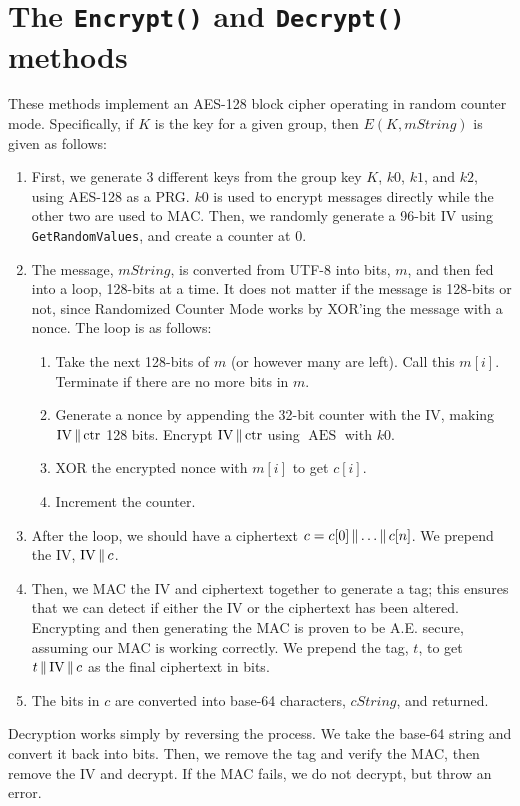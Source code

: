 \documentclass{amsart}
\DeclareMathOperator{\AES}{AES}
\begin{document}
\section{The \texttt{Encrypt()} and \texttt{Decrypt()} methods}%
These methods implement an AES-128 block cipher operating in random counter mode. Specifically, if $K$ is the key for a given group, then $E(K,mString)$ is given as follows:
\begin{enumerate}
\item First, we generate 3 different keys from the group key $K$, $k0$, $k1$, and $k2$, using AES-128 as a PRG. $k0$ is used to encrypt messages directly while the other two are used to MAC. Then, we randomly generate a 96-bit IV using \verb+GetRandomValues+, and create a counter at 0.
\item The message, $mString$, is converted from UTF-8 into bits, $m$, and then fed into a loop, 128-bits at a time. It does not matter if the message is 128-bits or not, since Randomized Counter Mode works by XOR'ing the message with a nonce. The loop is as follows:
  \begin{enumerate}
    \item Take the next 128-bits of $m$ (or however many are left). Call this $m[i]$. Terminate if there are no more bits in $m$.
    \item Generate a nonce by appending the 32-bit counter with the IV, making $\mathrm{IV}\operatorname{\|}\operatorname{ctr}$ 128 bits. Encrypt $\mathrm{IV}\operatorname{\|} \mathrm{ctr}$ using $\AES$ with $k0$.
    \item XOR the encrypted nonce with $m[i]$ to get $c[i]$.
    \item Increment the counter.
  \end{enumerate}
\item After the loop, we should have a ciphertext $c = c[0] \operatorname{\|} \dots \operatorname{\|} c[n]$. We prepend the IV, $\mathrm{IV} \operatorname{\|} c$.
\item Then, we MAC the IV and ciphertext together to generate a tag; this ensures that we can detect if either the IV or the ciphertext has been altered. Encrypting and then generating the MAC is proven to be A.E. secure, assuming our MAC is working correctly. We prepend the tag, $t$, to get $t \operatorname{\|} \mathrm{IV} \operatorname{\|} c$ as the final ciphertext in bits.
\item The bits in $c$ are converted into base-64 characters, $cString$, and returned.
\end{enumerate}

Decryption works simply by reversing the process. We take the base-64 string and convert it back into bits. Then, we remove the tag and verify the MAC, then remove the IV and decrypt. If the MAC fails, we do not decrypt, but throw an error.
\end{document}
